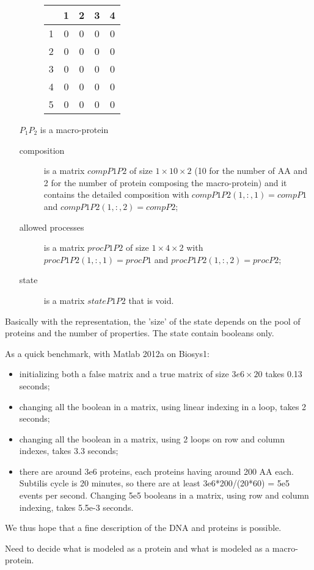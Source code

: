 \begin{enumerate}
\begin{description}
\begin{tabular}{|c|c|c|c|c|}
      & 1 & 2 & 3 & 4 \\ \hline
      1 & 0 & 0 & 0 & 0 \\
      2 & 0 & 0 & 0 & 0 \\
      3 & 0 & 0 & 0 & 0 \\
      4 & 0 & 0 & 0 & 0 \\
      5 & 0 & 0 & 0 & 0 \\
      \hline
    \end{tabular}
  \end{description}
  \item[$P_1P_2$] is a macro-protein
  \begin{description}
    \item[composition] is a matrix $compP1P2$ of size $1\times 10 \times 2$ (10 for the number of AA and 2 for the number of protein composing the macro-protein) and it contains the detailed composition with $compP1P2(1,:,1) = compP1$ and $compP1P2(1,:,2) = compP2$;
    \item[allowed processes] is a matrix $procP1P2$ of size $1\times 4\times 2$ with $procP1P2(1,:,1) = procP1$ and $procP1P2(1,:,2) = procP2$;
    \item[state] is a matrix $stateP1P2$ that is void.
  \end{description}
\end{enumerate}
Basically with the representation, the 'size' of the state depends on the pool of proteins and the number of properties. The state contain booleans only.

\medskip

As a quick benchmark, with Matlab 2012a on Biosys1:
\begin{itemize}
  \item initializing both a false matrix and a true matrix of size $3e6 \times 20$ takes 0.13 seconds;
  \item changing all the boolean in a matrix, using linear indexing in a loop, takes 2 seconds;
  \item changing all the boolean in a matrix, using 2 loops on row and column indexes, takes 3.3 seconds;
  \item there are around 3e6 proteins, each proteins having around 200 AA each. Subtilis cycle is 20 minutes, so there are at least 3e6*200/(20*60) = 5e5 events per second. Changing 5e5 booleans in a matrix, using row and column indexing, takes 5.5e-3 seconds.
\end{itemize}
We thus hope that a fine description of the DNA and proteins is possible.

\medskip

\textcolor[rgb]{1.00,0.00,0.00}{Need to decide what is modeled as a protein and what is modeled as a macro-protein.}


